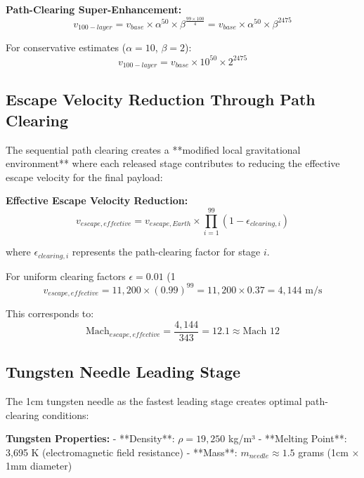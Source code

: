 \documentclass[12pt,a4paper]{article}
\begin{document}
\textbf{Path-Clearing Super-Enhancement:}
\begin{equation}
v_{100-layer} = v_{base} \times \alpha^{50} \times \beta^{\frac{99 \times 100}{4}} = v_{base} \times \alpha^{50} \times \beta^{2475}
\end{equation}

For conservative estimates ($\alpha = 10$, $\beta = 2$):
\begin{equation}
v_{100-layer} = v_{base} \times 10^{50} \times 2^{2475}
\end{equation}

\subsection{Escape Velocity Reduction Through Path Clearing}

The sequential path clearing creates a **modified local gravitational environment** where each released stage contributes to reducing the effective escape velocity for the final payload:

\textbf{Effective Escape Velocity Reduction:}
\begin{equation}
v_{escape,effective} = v_{escape,Earth} \times \prod_{i=1}^{99} (1 - \epsilon_{clearing,i})
\end{equation}

where $\epsilon_{clearing,i}$ represents the path-clearing factor for stage $i$.

For uniform clearing factors $\epsilon = 0.01$ (1%
\begin{equation}
v_{escape,effective} = 11,200 \times (0.99)^{99} = 11,200 \times 0.37 = 4,144 \text{ m/s}
\end{equation}

This corresponds to:
\begin{equation}
\text{Mach}_{escape,effective} = \frac{4,144}{343} = 12.1 \approx \text{Mach } 12
\end{equation}

\subsection{Tungsten Needle Leading Stage}

The 1cm tungsten needle as the fastest leading stage creates optimal path-clearing conditions:

\textbf{Tungsten Properties:}
- **Density**: $\rho = 19,250$ kg/m³
- **Melting Point**: 3,695 K (electromagnetic field resistance)
- **Mass**: $m_{needle} \approx 1.5$ grams (1cm × 1mm diameter)
\end{document}
